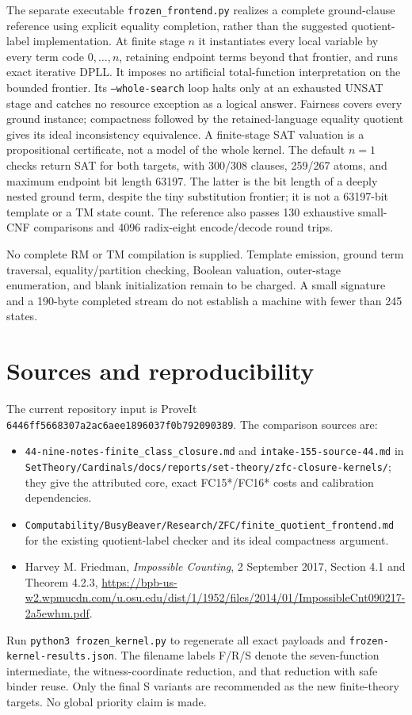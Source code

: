 \documentclass[11pt]{article}
\begin{document}
The separate executable \texttt{frozen\_frontend.py} realizes a complete
ground-clause reference using explicit equality completion, rather than
the suggested quotient-label implementation.  At finite stage $n$ it
instantiates every local variable by every term code $0,\ldots,n$, retaining
endpoint terms beyond that frontier, and runs exact iterative DPLL.  It
imposes no artificial total-function interpretation on the bounded
frontier.  Its \texttt{--whole-search} loop halts only at an exhausted UNSAT
stage and catches no resource exception as a logical answer.  Fairness
covers every ground instance; compactness followed by the retained-language
equality quotient gives its ideal inconsistency equivalence.  A finite-stage
SAT valuation is a propositional certificate, not a model of the whole kernel.
The default $n=1$ checks return SAT for both targets, with 300/308 clauses,
259/267 atoms, and maximum endpoint bit length 63197.  The latter is the
bit length of a deeply nested ground term, despite the tiny substitution
frontier; it is not a 63197-bit template or a TM state count.  The reference
also passes 130 exhaustive small-CNF comparisons and 4096 radix-eight
encode/decode round trips.

No complete RM or TM compilation is supplied.  Template emission, ground
term traversal, equality/partition checking, Boolean valuation, outer-stage
enumeration, and blank initialization remain to be charged.  A small
signature and a 190-byte completed stream do not establish a machine with
fewer than 245 states.

\section*{Sources and reproducibility}

The current repository input is ProveIt
\texttt{6446ff5668307a2ac6aee1896037f0b792090389}.  The comparison sources are:
\begin{itemize}
\item \texttt{44-nine-notes-finite\_class\_closure.md} and
\texttt{intake-155-source-44.md} in
\texttt{SetTheory/Cardinals/docs/reports/set-theory/zfc-closure-kernels/};
they give the attributed core, exact FC15*/FC16* costs and calibration
dependencies.
\item \texttt{Computability/BusyBeaver/Research/ZFC/finite\_quotient\_frontend.md}
for the existing quotient-label checker and its ideal compactness argument.
\item Harvey M. Friedman, \emph{Impossible Counting}, 2 September 2017,
Section 4.1 and Theorem 4.2.3,\newline
\url{https://bpb-us-w2.wpmucdn.com/u.osu.edu/dist/1/1952/files/2014/01/ImpossibleCnt090217-2a5ewhm.pdf}.
\end{itemize}
Run \texttt{python3 frozen\_kernel.py} to regenerate all exact payloads and
\texttt{frozen-kernel-results.json}.  The filename labels F/R/S denote the
seven-function intermediate, the witness-coordinate reduction, and that
reduction with safe binder reuse.  Only the final S variants are recommended
as the new finite-theory targets.  No global priority claim is made.
\end{document}
